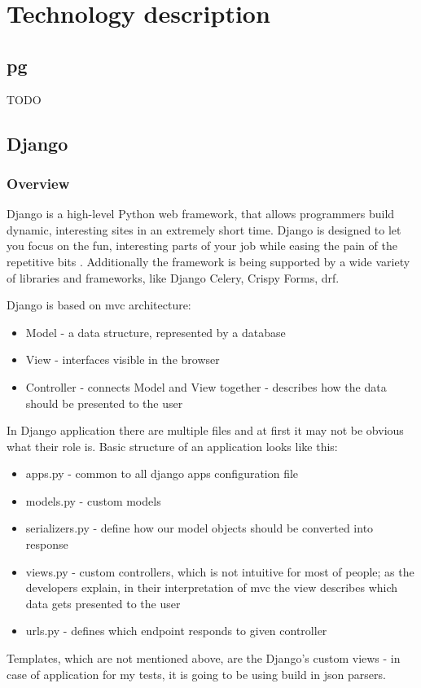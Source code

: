
\chapter{Technology description}


\section{\acrlong{pg}}

TODO

\section{Django}

\subsection{Overview}
Django is a high-level Python web framework, that allows programmers build dynamic, interesting sites in an extremely short time. Django is designed to let you focus on the fun, interesting parts of your job while easing the pain of the repetitive bits \cite{djangobook}. Additionally the framework is being supported by a wide variety of libraries and frameworks, like Django Celery, Crispy Forms, \acrfull{drf}.

Django is based on \acrshort{mvc} architecture:
\begin{itemize}
  \item Model - a data structure, represented by a database
  \item View - interfaces visible in the browser
  \item Controller - connects Model and View together - describes how the data should be presented to the user
\end{itemize}
In Django application there are multiple files and at first it may not be obvious what their role is. Basic structure of an application looks like this:
\begin{itemize}
  \item apps.py - common to all django apps configuration file
  \item models.py - custom models
  \item serializers.py - define how our model objects should be converted into response
  \item views.py - custom controllers, which is not intuitive for most of people; as the developers explain, in their interpretation of \acrshort{mvc} the view describes which data gets presented to the user \cite{djangoWhyViews}
  \item urls.py - defines which endpoint responds to given controller
\end{itemize}
Templates, which are not mentioned above, are the Django's custom views - in case of application for my tests, it is going to be using build in json parsers.

